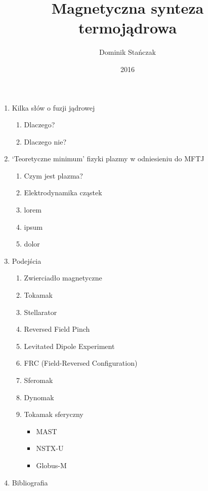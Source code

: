 \documentclass{article}
\begin{document}
\title{Magnetyczna synteza termojądrowa}
\author{Dominik Stańczak}
\date{2016}

\maketitle
\begin{enumerate}
    \item Kilka słów o fuzji jądrowej
    \begin{enumerate}
        \item Dlaczego?
        \item Dlaczego nie?
    \end{enumerate}
    \item `Teoretyczne minimum' fizyki plazmy w odniesieniu do MFTJ
    \begin{enumerate}
        \item Czym jest plazma?
        \item Elektrodynamika cząstek
        \item lorem
        \item ipsum
        \item dolor
    \end{enumerate}
    \item Podejścia
    \begin{enumerate}
        \item Zwierciadło magnetyczne
        \item Tokamak
        \item Stellarator
        \item Reversed Field Pinch
        \item Levitated Dipole Experiment
        \item FRC (Field-Reversed Configuration)
        \item Sferomak
        \item Dynomak
        \item Tokamak sferyczny
        \begin{itemize}
            \item MAST
            \item NSTX-U
            \item Globus-M
        \end{itemize}
    \end{enumerate}
    \item Bibliografia
\end{enumerate}
\end{document}
